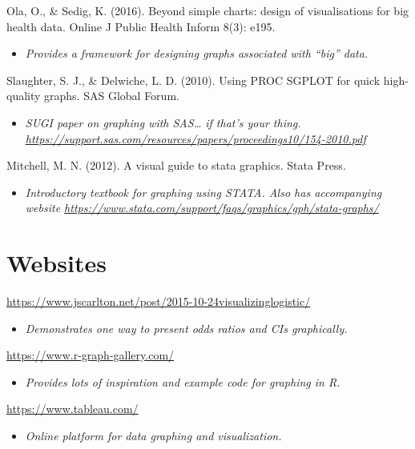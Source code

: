 \documentclass[
]{book}
\providecommand{\tightlist}{%
  \setlength{\itemsep}{0pt}\setlength{\parskip}{0pt}}
\begin{document}
Ola, O., \& Sedig, K. (2016). Beyond simple charts: design of visualisations for big health data. Online J Public Health Inform 8(3): e195.

\begin{itemize}
\tightlist
\item
  \emph{Provides a framework for designing graphs associated with ``big'' data.}
\end{itemize}

Slaughter, S. J., \& Delwiche, L. D. (2010). Using PROC SGPLOT for quick high-quality graphs. SAS Global Forum.

\begin{itemize}
\tightlist
\item
  \emph{SUGI paper on graphing with SAS\ldots{} if that's your thing. \url{https://support.sas.com/resources/papers/proceedings10/154-2010.pdf}}
\end{itemize}

Mitchell, M. N. (2012). A visual guide to stata graphics. Stata Press.

\begin{itemize}
\tightlist
\item
  \emph{Introductory textbook for graphing using STATA. Also has accompanying website \url{https://www.stata.com/support/faqs/graphics/gph/stata-graphs/}}
\end{itemize}

\hypertarget{websites-1}{%
\section{Websites}\label{websites-1}}

\url{https://www.jscarlton.net/post/2015-10-24visualizinglogistic/}

\begin{itemize}
\tightlist
\item
  \emph{Demonstrates one way to present odds ratios and CIs graphically.}
\end{itemize}

\url{https://www.r-graph-gallery.com/}

\begin{itemize}
\tightlist
\item
  \emph{Provides lots of inspiration and example code for graphing in R.}
\end{itemize}

\url{https://www.tableau.com/}

\begin{itemize}
\tightlist
\item
  \emph{Online platform for data graphing and visualization.}
\end{itemize}
\end{document}
